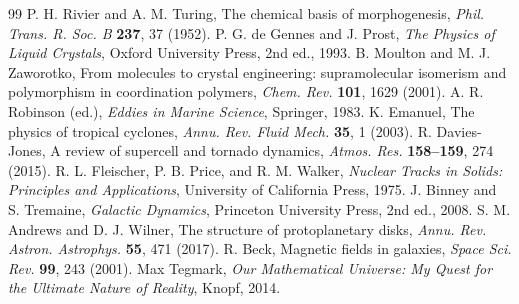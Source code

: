 \documentclass[12pt]{article}
\begin{document}
\begin{thebibliography}{99}
		P. H. Rivier and A. M. Turing, The chemical basis of morphogenesis, \emph{Phil. Trans. R. Soc. B} \textbf{237}, 37 (1952).
		P. G. de Gennes and J. Prost, \emph{The Physics of Liquid Crystals}, Oxford University Press, 2nd ed., 1993.
		B. Moulton and M. J. Zaworotko, From molecules to crystal engineering: supramolecular isomerism and polymorphism in coordination polymers, \emph{Chem. Rev.} \textbf{101}, 1629 (2001).
		A. R. Robinson (ed.), \emph{Eddies in Marine Science}, Springer, 1983.
		K. Emanuel, The physics of tropical cyclones, \emph{Annu. Rev. Fluid Mech.} \textbf{35}, 1 (2003).
		R. Davies-Jones, A review of supercell and tornado dynamics, \emph{Atmos. Res.} \textbf{158--159}, 274 (2015).
		R. L. Fleischer, P. B. Price, and R. M. Walker, \emph{Nuclear Tracks in Solids: Principles and Applications}, University of California Press, 1975.
		J. Binney and S. Tremaine, \emph{Galactic Dynamics}, Princeton University Press, 2nd ed., 2008.
		S. M. Andrews and D. J. Wilner, The structure of protoplanetary disks, \emph{Annu. Rev. Astron. Astrophys.} \textbf{55}, 471 (2017).
		R. Beck, Magnetic fields in galaxies, \emph{Space Sci. Rev.} \textbf{99}, 243 (2001).
		Max Tegmark, \emph{Our Mathematical Universe: My Quest for the Ultimate Nature of Reality}, Knopf, 2014.
	\end{thebibliography}
	
\end{document}
